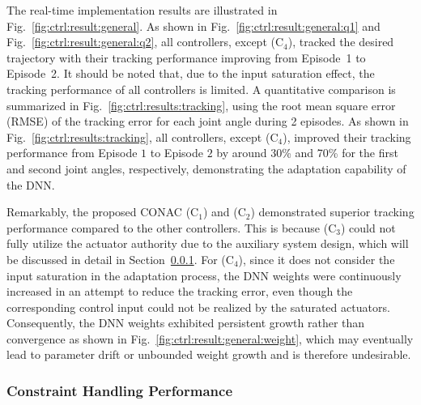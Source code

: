 \documentclass[letterpaper, journal, twoside]{IEEEtran}
\begin{document}
The real-time implementation results are illustrated in Fig.~\ref{fig:ctrl:result:general}.
As shown in Fig.~\ref{fig:ctrl:result:general:q1} and Fig.~\ref{fig:ctrl:result:general:q2}, all controllers, except (C$_4$), tracked the desired trajectory with their tracking performance improving from
Episode~1 to Episode~2.
It should be noted that, due to the input saturation effect, the tracking performance of all controllers is limited.
A quantitative comparison is summarized in Fig.~\ref{fig:ctrl:results:tracking}, using the root mean square error (RMSE) of the tracking error for each joint angle during 2 episodes.
As shown in Fig.~\ref{fig:ctrl:results:tracking}, all controllers, except (C$_4$), improved their tracking performance from Episode $1$ to Episode $2$ by around 30\% and 70\% for the first and second joint angles, respectively, demonstrating the adaptation capability of the DNN.

Remarkably, the proposed CONAC (C$_1$) and (C$_2$) demonstrated superior tracking performance compared to the other controllers.
This is because (C$_3$) could not fully utilize the actuator authority due to the auxiliary system design, which will be discussed in detail in Section~\ref{sec:val:results:constraint}.
For (C$_4$), since it does not consider the input saturation in the adaptation process, the DNN weights were continuously increased in an attempt to reduce the tracking error, even though the corresponding control input could not be realized by the saturated actuators.
Consequently, the DNN weights exhibited persistent growth rather than convergence as shown in Fig.~\ref{fig:ctrl:result:general:weight}, which may eventually lead to parameter drift or unbounded weight growth and is therefore undesirable.


\subsubsection{Constraint Handling Performance} \label{sec:val:results:constraint}
\end{document}
